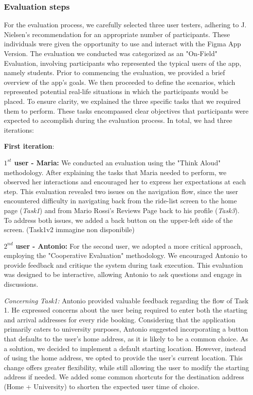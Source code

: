 \documentclass{article}
\begin{document}
\subsubsection{Evaluation steps}
For the evaluation process, we carefully selected three user testers, adhering to J. Nielsen's recommendation for an appropriate number of participants. These individuals were given the opportunity to use and interact with the Figma App Version. The evaluation we conducted was categorized as an "On-Field" Evaluation, involving participants who represented the typical users of the app, namely students. Prior to commencing the evaluation, we provided a brief overview of the app's goals. We then proceeded to define the scenarios, which represented potential real-life situations in which the participants would be placed. To ensure clarity, we explained the three specific tasks that we required them to perform. These tasks encompassed clear objectives that participants were expected to accomplish during the evaluation process. In total, we had three iterations: \newline \newline 

\textbf{First iteration}: \newline 
\graphicspath{{Doc images/Interactive prototyping/First iteration}}
\textbf{$1^{st}$ user - Maria:} We conducted an evaluation using the "Think Aloud" methodology. After explaining the tasks that Maria needed to perform, we observed her interactions and encouraged her to express her expectations at each step. This evaluation revealed two issues on the navigation flow, since the user encountered difficulty in navigating back from the ride-list screen to the home page (\textit{Task1}) and from Mario Rossi's Reviews Page back to his profile (\textit{Task3}). To address both issues, we added a back button on the upper-left side of the screen. (Task1v2 immagine non disponibile) \newline 

\textbf{$2^{nd}$ user - Antonio:} For the second user, we adopted a more critical approach, employing the "Cooperative Evaluation" methodology. We encouraged Antonio to provide feedback and critique the system during task execution. This evaluation was designed to be interactive, allowing Antonio to ask questions and engage in discussions. \newline

\textit{Concerning Task1:} Antonio provided valuable feedback regarding the flow of Task 1. He expressed concerns about the user being required to enter both the starting and arrival addresses for every ride booking. Considering that the application primarily caters to university purposes, Antonio suggested incorporating a button that defaults to the user's home address, as it is likely to be a common choice. As a solution, we decided to implement a default starting location. However, instead of using the home address, we opted to provide the user's current location. This change offers greater flexibility, while still allowing the user to modify the starting address if needed. We added some common shortcuts for the destination address (Home + University) to shorten the expected user time of choice. 
\end{document}
